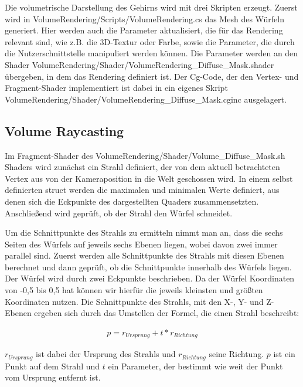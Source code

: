 Die volumetrische Darstellung des Gehirns wird mit drei Skripten erzeugt. Zuerst wird in VolumeRendering/Scripts/VolumeRendering.cs das Mesh des Würfeln generiert. Hier werden auch die Parameter aktualisiert, die für das Rendering relevant sind, wie z.B. die 3D-Textur oder Farbe, sowie die Parameter, die durch die Nutzerschnittstelle manipuliert werden können. 
Die Parameter werden an den Shader VolumeRendering/Shader/VolumeRendering\_Diffuse\_Mask.shader übergeben, in dem das Rendering definiert ist. Der Cg-Code, der den Vertex- und Fragment-Shader implementiert ist dabei in ein eigenes Skript VolumeRendering/Shader/VolumeRendering\_Diffuse\_Mask.cginc ausgelagert.

\subsection{Volume Raycasting}
\label{3dImplementierung}
Im Fragment-Shader des VolumeRendering/Shader/Volume\_Diffuse\_Mask.sh Shaders wird zunächst ein Strahl definiert, der von dem aktuell betrachteten Vertex aus von der Kameraposition in die Welt geschossen wird. In einem selbst definierten struct werden die maximalen und minimalen Werte definiert, aus denen sich die Eckpunkte des dargestellten Quaders zusammensetzten. Anschließend wird geprüft, ob der Strahl den Würfel schneidet. 

Um die Schnittpunkte des Strahls zu ermitteln nimmt man an, dass die sechs Seiten des Würfels auf jeweils sechs Ebenen liegen, wobei davon zwei immer parallel sind. Zuerst werden alle Schnittpunkte des Strahls mit diesen Ebenen berechnet und dann geprüft, ob die Schnittpunkte innerhalb des Würfels liegen.
Der Würfel wird durch zwei Eckpunkte beschrieben. Da der Würfel Koordinaten von -0,5 bis 0,5 hat können wir hierfür die jeweils kleinsten und größten Koordinaten nutzen. 
Die Schnittpunkte des Strahls, mit den X-, Y- und Z-Ebenen ergeben sich durch das Umstellen der Formel, die einen Strahl beschreibt:

\begin{align}
p=r_{Ursprung}+t*r_{Richtung}
\end{align}

$r_{Ursprung}$ ist dabei der Ursprung des Strahls und $r_{Richtung}$ seine Richtung. $p$ ist ein Punkt auf dem Strahl und $t$ ein Parameter, der bestimmt wie weit der Punkt vom Ursprung entfernt ist.

